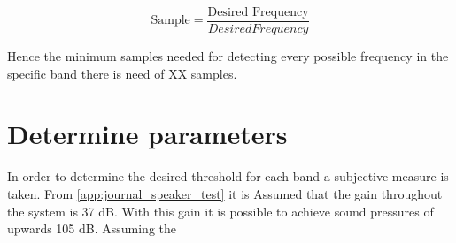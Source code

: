 \begin{equation}\label{eq:Minsample}
\text{Sample}= \frac{\text{Desired Frequency}}{Desired Frequency}
\end{equation} 

Hence the minimum samples needed for detecting every possible frequency in the specific band there is need of XX samples.

\section{Determine parameters}
In order to determine the desired threshold for each band a subjective measure is taken.
From \autoref{app:journal_speaker_test} it is Assumed that the gain throughout the system is 37 dB. With this gain it is possible to achieve sound pressures of upwards 105 dB. Assuming the 







